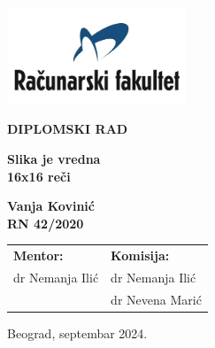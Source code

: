 \documentclass[12pt]{article}
\begin{document}
   \begin{titlepage}
      \begin{center}
         
         \vspace*{-1in}
         \includegraphics[width=0.4\textwidth]{raf_logo.png}

         \vspace{1in}
         \Large
         \textbf{DIPLOMSKI RAD}
         
         \vspace{1in}
         \fontsize{32pt}{32pt}\selectfont
         \textbf{Slika je vredna \\ 16x16 reči}
         
         \vspace{1in}


         \fontsize{14pt}{18pt}\selectfont
         \textbf{Vanja Kovinić} \\
         \textbf{RN 42/2020}
         \vspace*{1.3in}
         
         \begin{center}
            \normalsize
            \begin{tabular}{p{} p{}}
               \fontsize{14pt}{18pt}\selectfont   
               \textbf{Mentor:} & 
            
               \fontsize{14pt}{18pt}\selectfont
               \textbf{Komisija:} \\
               dr Nemanja Ilić & dr Nemanja Ilić \\
                                 & dr Nevena Marić \\
            \end{tabular}
         \end{center}

         \vspace*{\fill}

         \normalsize
         Beograd, septembar 2024.


         
      \end{center}
   \end{titlepage}
   \restoregeometry %
\end{document}
